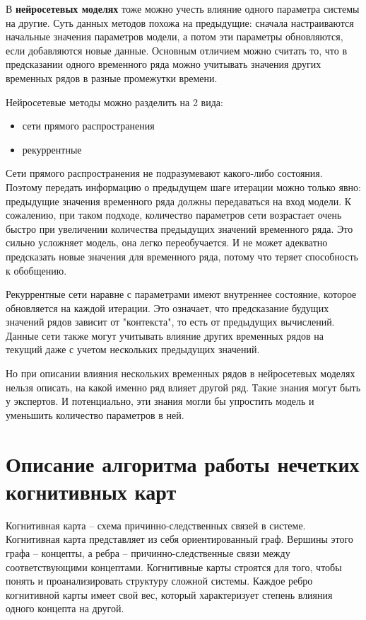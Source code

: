 В \textbf{нейросетевых моделях} тоже можно учесть влияние одного параметра системы на другие.
Суть данных методов похожа на предыдущие: сначала настраиваются начальные
значения параметров модели, а потом эти параметры обновляются, если добавляются новые данные.
Основным отличием можно считать то, что в предсказании одного временного ряда можно
учитывать значения других временных рядов в разные промежутки времени.

Нейросетевые методы можно разделить на 2 вида:
\begin{itemize}
	\item сети прямого распространения
	\item рекуррентные
\end{itemize}

Сети прямого распространения не подразумевают какого-либо состояния.
Поэтому передать информацию о предыдущем шаге итерации можно только явно:
предыдущие значения временного ряда должны передаваться на вход модели.
К сожалению, при таком подходе, количество параметров сети возрастает очень быстро
при увеличении количества предыдущих значений временного ряда. Это сильно усложняет модель,
она легко переобучается. И не может адекватно предсказать новые значения для временного ряда,
потому что теряет способность к обобщению.

Рекуррентные сети наравне с параметрами имеют внутреннее состояние, которое обновляется на каждой
итерации. Это означает, что предсказание будущих значений рядов зависит от "контекста",
то есть от предыдущих вычислений. Данные сети также могут учитывать влияние других
временных рядов на текущий даже с учетом нескольких предыдущих значений.

Но при описании влияния нескольких временных рядов в нейросетевых моделях
нельзя описать, на какой именно ряд влияет другой ряд. Такие знания могут быть у
экспертов. И потенциально, эти знания могли бы упростить модель и уменьшить количество
параметров в ней.



\section{Описание алгоритма работы нечетких когнитивных карт}

Когнитивная карта – схема причинно-следственных связей в системе.
Когнитивная карта представляет из себя ориентированный граф.
Вершины этого графа – концепты, а ребра – причинно-следственные связи между соответствующими концептами.
Когнитивные карты строятся для того, чтобы понять и проанализировать структуру сложной системы.
Каждое ребро когнитивной карты имеет свой вес, который характеризует степень влияния одного концепта на другой.

